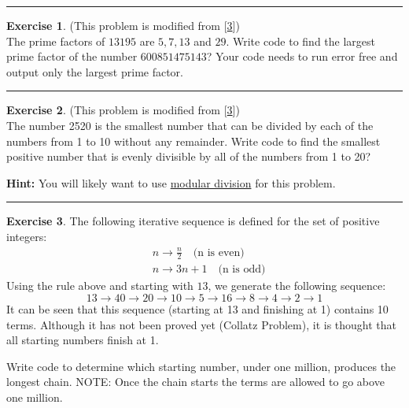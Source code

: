 \documentclass[
]{book}
\theoremstyle{definition}
\theoremstyle{definition}
\theoremstyle{definition}
\newtheorem{exercise}{Exercise}[chapter]
\theoremstyle{remark}
\begin{document}
\begin{center}\rule{0.5\linewidth}{0.5pt}\end{center}

\begin{exercise}
\protect\hypertarget{exr:unnamed-chunk-59}{}{\label{exr:unnamed-chunk-59} }(This problem is modified from {[}\protect\hyperlink{ref-euler}{3}{]})\\
The prime factors of \(13195\) are \(5, 7, 13\) and \(29\). Write code to find
the largest prime factor of the number \(600851475143\)? Your code needs
to run error free and output only the largest prime factor.
\end{exercise}

\begin{center}\rule{0.5\linewidth}{0.5pt}\end{center}

\begin{exercise}
\protect\hypertarget{exr:unnamed-chunk-60}{}{\label{exr:unnamed-chunk-60} }(This problem is modified from {[}\protect\hyperlink{ref-euler}{3}{]})\\
The number 2520 is the smallest number that can be divided by each of
the numbers from 1 to 10 without any remainder. Write code to find the
smallest positive number that is evenly divisible by all of the numbers
from 1 to 20?

\textbf{Hint:} You will likely want to use \href{https://python-reference.readthedocs.io/en/latest/docs/operators/modulus.html}{modular division} for this problem.
\end{exercise}

\begin{center}\rule{0.5\linewidth}{0.5pt}\end{center}

\begin{exercise}
\protect\hypertarget{exr:unnamed-chunk-61}{}{\label{exr:unnamed-chunk-61} }The following iterative sequence is defined for the set of positive
integers:
\[\begin{aligned}
        & n \to \frac{n}{2} \quad \text{(n is even)} \\
        & n \to 3n + 1 \quad \text{(n is odd)}
    \end{aligned}\]
Using the rule above and starting with \(13\), we
generate the following sequence:
\[13 \to  40 \to 20 \to 10 \to 5 \to 16 \to 8 \to 4 \to 2 \to 1\] It can
be seen that this sequence (starting at 13 and finishing at 1) contains
10 terms. Although it has not been proved yet (Collatz Problem), it is
thought that all starting numbers finish at 1.

Write code to determine which starting number, under one million,
produces the longest chain. NOTE: Once the chain starts the terms are
allowed to go above one million.
\end{exercise}
\end{document}
